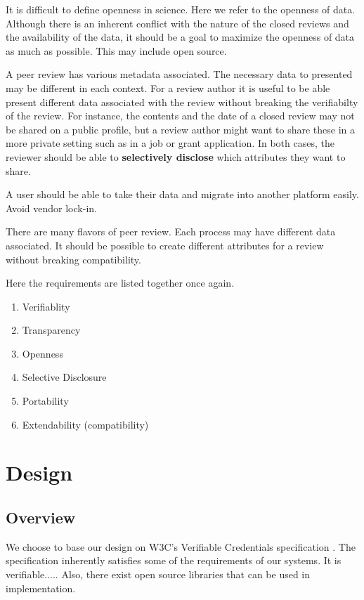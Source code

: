 It is difficult to define openness in science. Here we refer to the openness of data. Although there is an inherent conflict with the nature of the closed reviews and the availability of the data, it should be a goal to maximize the openness of data as much as possible. This may include open source.

A peer review has various metadata associated. The necessary data to presented may be different in each context. For a review author it is useful to be able present different data associated with the review without breaking the verifiabilty of the review. For instance, the contents and the date of a closed review may not be shared on a public profile, but a review author might want to share these in a more private setting such as in a job or grant application. In both cases, the reviewer should be able to \textbf{selectively disclose} which attributes they want to share.

A user should be able to take their data and migrate into another platform easily. Avoid vendor lock-in. 

There are many flavors of peer review. Each process may have different data associated. It should be possible to create different attributes for a review without breaking compatibility.

Here the requirements are listed together once again.
\begin{enumerate}
  \item Verifiablity
  \item Transparency
  \item Openness
  \item Selective Disclosure
  \item Portability
  \item Extendability (compatibility)
\end{enumerate}

\section{Design}

\subsection{Overview}

We choose to base our design on W3C's Verifiable Credentials specification \parencite{Sporny.18Kas2019}. The specification inherently satisfies some of the requirements of our systems. It is verifiable..... Also, there exist open source libraries that can be used in implementation.

